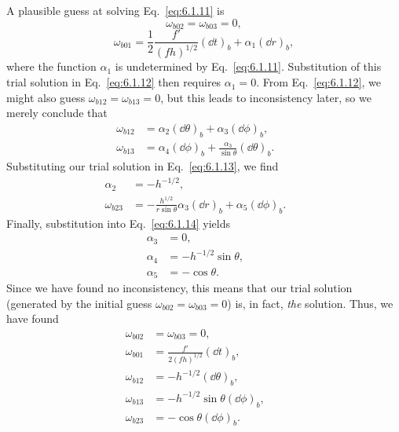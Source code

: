 A plausible guess at solving Eq.~\eqref{eq:6.1.11} is
\begin{equation}
  \omega_{b02}=\omega_{b03}=0,
  \tag{6.1.15}\label{eq:6.1.15}
\end{equation}
\begin{equation}
  \omega_{b01}=\frac12\frac{f'}{(fh)^{1/2}}(\dd t)_b+\alpha_1(\dd r)_b,
  \tag{6.1.16}\label{eq:6.1.16}
\end{equation}
where the function \(\alpha_1\) is undetermined by Eq.~\eqref{eq:6.1.11}.
Substitution of this trial solution in Eq.~\eqref{eq:6.1.12} then requires
\(\alpha_1=0\). From Eq.~\eqref{eq:6.1.12}, we might also guess
\(\omega_{b12}=\omega_{b13}=0\), but this leads to inconsistency later, so we
merely conclude that
\begin{align}
  \omega_{b12}&=\alpha_2(\dd\theta)_b+\alpha_3(\dd\phi)_b,
  &&\tag{6.1.17}\label{eq:6.1.17}\\
  \omega_{b13}&=\alpha_4(\dd\phi)_b+\frac{\alpha_3}{\sin\theta}(\dd\theta)_b.
  &&\tag{6.1.18}\label{eq:6.1.18}
\end{align}
Substituting our trial solution in Eq.~\eqref{eq:6.1.13}, we find
\begin{align}
  \alpha_2&=-h^{-1/2},
  &&\tag{6.1.19}\label{eq:6.1.19}\\
  \omega_{b23}&=-\frac{h^{1/2}}{r\sin\theta}\alpha_3(\dd r)_b+\alpha_5(\dd\phi)_b.
  &&\tag{6.1.20}\label{eq:6.1.20}
\end{align}
Finally, substitution into Eq.~\eqref{eq:6.1.14} yields
\begin{align}
  \alpha_3&=0,
  &&\tag{6.1.21}\label{eq:6.1.21}\\
  \alpha_4&=-h^{-1/2}\sin\theta,
  &&\tag{6.1.22}\label{eq:6.1.22}\\
  \alpha_5&=-\cos\theta.
  &&\tag{6.1.23}\label{eq:6.1.23}
\end{align}
Since we have found no inconsistency, this means that our trial solution
(generated by the initial guess \(\omega_{b02}=\omega_{b03}=0\)) is, in fact,
\emph{the} solution. Thus, we have found
\begin{align}
  \omega_{b02}&=\omega_{b03}=0,
  &&\tag{6.1.24}\label{eq:6.1.24}\\
  \omega_{b01}&=\frac{f'}{2(fh)^{1/2}}(\dd t)_b,
  &&\tag{6.1.25}\label{eq:6.1.25}\\
  \omega_{b12}&=-h^{-1/2}(\dd\theta)_b,
  &&\tag{6.1.26}\label{eq:6.1.26}\\
  \omega_{b13}&=-h^{-1/2}\sin\theta(\dd\phi)_b,
  &&\tag{6.1.27}\label{eq:6.1.27}\\
  \omega_{b23}&=-\cos\theta(\dd\phi)_b.
  &&\tag{6.1.28}\label{eq:6.1.28}
\end{align}

